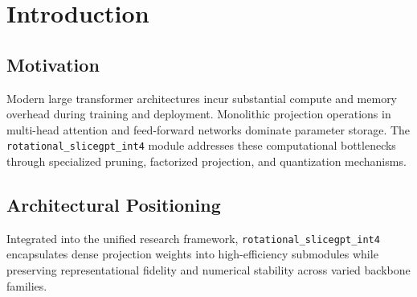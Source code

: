 \section{Introduction}

\subsection{Motivation}
Modern large transformer architectures incur substantial compute and memory overhead during training and deployment. Monolithic projection operations in multi-head attention and feed-forward networks dominate parameter storage. The \texttt{rotational_slicegpt_int4} module addresses these computational bottlenecks through specialized pruning, factorized projection, and quantization mechanisms.

\subsection{Architectural Positioning}
Integrated into the unified research framework, \texttt{rotational_slicegpt_int4} encapsulates dense projection weights into high-efficiency submodules while preserving representational fidelity and numerical stability across varied backbone families.
